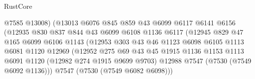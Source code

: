 \begin{lexlean}{RustCore}
\begin{coremodule}
                                    @7585
                                    @13008)
                                  (@13013
                                    @6076
                                    @845
                                    @859
                                    @43
                                    @6099
                                    @6117
                                    @6141
                                    @6156
                                    (@12935
                                      @830
                                      @837
                                      @844
                                      @43
                                      @6099
                                      @6108
                                      @1136
                                      @6117
                                      (@12945
                                        @829
                                        @47
                                        @165
                                        @6099
                                        @6106
                                        @1143
                                        (@12953
                                          @303
                                          @43
                                          @46
                                          @1123
                                          @6098
                                          @6105
                                          @1113
                                          @6081
                                          @1120
                                          @12969
                                          (@12952
                                            @275
                                            @69
                                            @43
                                            @45
                                            @1915
                                            @1136
                                            @1153
                                            @1113
                                            @6091
                                            @1120
                                            (@12982 @274 @1915 @9699 @9703)
                                            @12988
                                            @7547
                                            (@7530 (@7549 @6092 @1136)))
                                          @7547
                                          (@7530 (@7549 @6082 @6098)))

\end{coremodule}
\end{lexlean}

